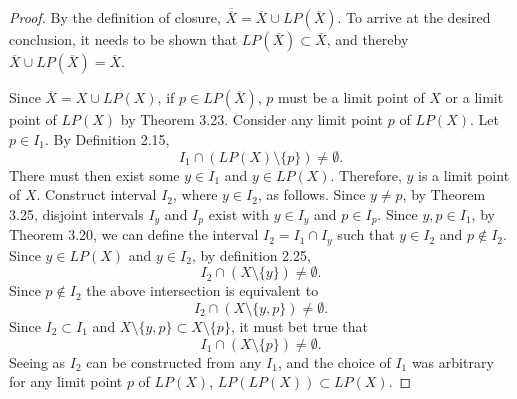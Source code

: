 \documentclass{amsart}
\newcommand{\1}{\mathds{1}}
\numberwithin{equation}{section}
\numberwithin{theorem}{section}
\begin{document}
\begin{proof}
	By the definition of closure, $\overline{\overline{X}} = \overline{X} \cup LP(\overline{X})$. To arrive at the desired conclusion, it needs to be shown that $LP(\overline{X})\subset \overline{X}$, and thereby $\overline{X} \cup LP(\overline{X}) = \overline{X}$. 
	
	Since $\overline{X} = X \cup LP(X)$, if $p\in LP(\overline{X})$, $p$ must be a limit point of $X$ or a limit point of $LP(X)$ by Theorem 3.23. Consider any limit point $p$ of $LP(X)$. Let $p\in I_1$. By Definition 2.15, $$I_1 \cap (LP(X)\setminus \{p\}) \not= \emptyset.$$ There must then exist some $y\in I_1$ and $y\in LP(X)$. Therefore, $y$ is a limit point of $X$. Construct interval $I_2$, where $y\in I_2$, as follows. Since $y\not=p$, by Theorem 3.25, disjoint intervals $I_y$ and $I_p$ exist with $y\in I_y$ and $p\in I_p$. Since $y,p\in I_1$, by Theorem 3.20, we can define the interval $I_2 = I_1 \cap I_y$ such that $y\in I_2$ and $p\notin I_2$. Since $y\in LP(X)$ and $y\in I_2$, by definition 2.25, $$I_2 \cap (X\setminus \{y\}) \not= \emptyset.$$ Since $p\notin I_2$ the above intersection is equivalent to $$I_2 \cap (X\setminus \{y,p\}) \not= \emptyset.$$ Since $I_2\subset I_1$ and $X\setminus \{y,p\} \subset X\setminus \{p\}$, it must bet true that $$I_1 \cap (X\setminus \{p\}) \not= \emptyset.$$ Seeing as $I_2$ can be constructed from any $I_1$, and the choice of $I_1$ was arbitrary for any limit point $p$ of $LP(X)$, $LP(LP(X))\subset LP(X)$. 
	
\end{proof}
\end{document}

